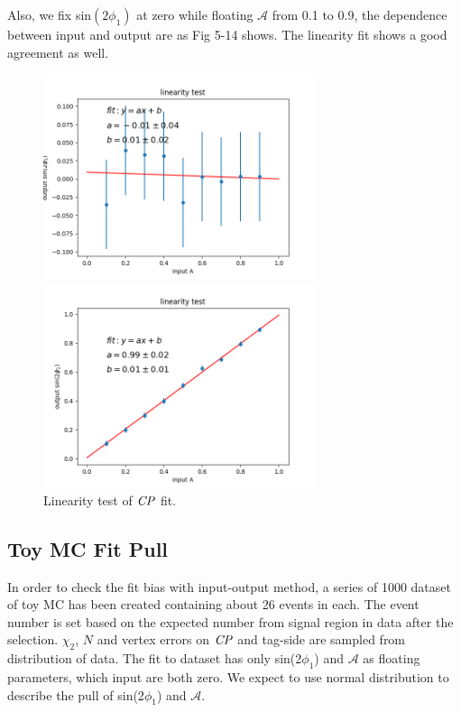 Also, we fix  sin$(2\phi_1)$ at zero while floating $\mathcal{A}$ from  0.1 to 0.9, the dependence between input and output are as Fig 5-14 shows. The linearity fit shows a good agreement as well.
\begin{figure}[H]
	\begin{minipage}{0.5\linewidth}
		\includegraphics[height=6cm]{figures/S-test-line_fixS}
	\end{minipage}
	\begin{minipage}{0.5\linewidth}
		\includegraphics[height=6cm]{figures/A-test-line_fixS}
	\end{minipage}
	\caption{Linearity test of $\it{CP}$ fit.}
\end{figure}

\subsection{Toy MC Fit Pull}
In order to check the fit bias with input-output method, a series of 1000 dataset of toy MC has been created containing about 26 events in each. The event number is set based on the expected number from signal region in data after the selection.  $\chi_2$, $N$ and vertex errors on $\it{CP}$ and tag-side are sampled from distribution of data. The fit to dataset has only  sin(2$\phi_1$) and $\mathcal{A}$ as floating parameters, which input are both zero.
We expect to use normal distribution to describe the pull of sin(2$\phi_1$) and $\mathcal{A}$. 

